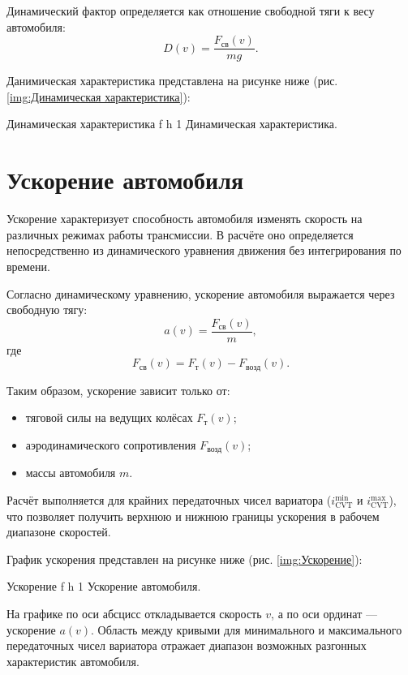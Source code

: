 Динамический фактор определяется как отношение свободной тяги к весу автомобиля:
\[
D(v) = \frac{F_{\text{св}}(v)}{m g}.
\]

Данимическая характеристика представлена на рисунке ниже (рис. \ref{img:Динамическая характеристика}):

    {Динамическая характеристика} %
    {f} %
    {h} %
    {1\textwidth} %
    {Динамическая характеристика.} %

\section{Ускорение автомобиля}

Ускорение характеризует способность автомобиля изменять скорость на различных
режимах работы трансмиссии. В расчёте оно определяется непосредственно из
динамического уравнения движения без интегрирования по времени.

Согласно динамическому уравнению, ускорение автомобиля выражается через
свободную тягу:
\[
a(v) = \frac{F_{\text{св}}(v)}{m},
\]
где
\[
F_{\text{св}}(v) = F_{\text{т}}(v) - F_{\text{возд}}(v).
\]

Таким образом, ускорение зависит только от:
\begin{itemize}
    \item тяговой силы на ведущих колёсах $F_{\text{т}}(v)$;
    \item аэродинамического сопротивления $F_{\text{возд}}(v)$;
    \item массы автомобиля $m$.
\end{itemize}

Расчёт выполняется для крайних передаточных чисел вариатора
($i_{\mathrm{CVT}}^{\min}$ и $i_{\mathrm{CVT}}^{\max}$), что позволяет получить
верхнюю и нижнюю границы ускорения в рабочем диапазоне скоростей.

График ускорения представлен на рисунке ниже (рис. \ref{img:Ускорение}):

    {Ускорение} %
    {f} %
    {h} %
    {1\textwidth} %
    {Ускорение автомобиля.} %

На графике по оси абсцисс откладывается скорость $v$, а по оси ординат —
ускорение $a(v)$. Область между кривыми для минимального и максимального
передаточных чисел вариатора отражает диапазон возможных разгонных
характеристик автомобиля.

